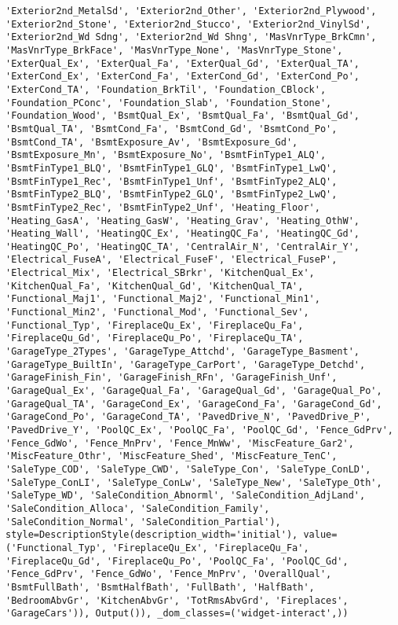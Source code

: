 \documentclass[11pt]{article}
\begin{document}
\begin{verbatim}
'Exterior2nd_MetalSd', 'Exterior2nd_Other', 'Exterior2nd_Plywood', 'Exterior2nd_Stone', 'Exterior2nd_Stucco', 'Exterior2nd_VinylSd', 'Exterior2nd_Wd Sdng', 'Exterior2nd_Wd Shng', 'MasVnrType_BrkCmn', 'MasVnrType_BrkFace', 'MasVnrType_None', 'MasVnrType_Stone', 'ExterQual_Ex', 'ExterQual_Fa', 'ExterQual_Gd', 'ExterQual_TA', 'ExterCond_Ex', 'ExterCond_Fa', 'ExterCond_Gd', 'ExterCond_Po', 'ExterCond_TA', 'Foundation_BrkTil', 'Foundation_CBlock', 'Foundation_PConc', 'Foundation_Slab', 'Foundation_Stone', 'Foundation_Wood', 'BsmtQual_Ex', 'BsmtQual_Fa', 'BsmtQual_Gd', 'BsmtQual_TA', 'BsmtCond_Fa', 'BsmtCond_Gd', 'BsmtCond_Po', 'BsmtCond_TA', 'BsmtExposure_Av', 'BsmtExposure_Gd', 'BsmtExposure_Mn', 'BsmtExposure_No', 'BsmtFinType1_ALQ', 'BsmtFinType1_BLQ', 'BsmtFinType1_GLQ', 'BsmtFinType1_LwQ', 'BsmtFinType1_Rec', 'BsmtFinType1_Unf', 'BsmtFinType2_ALQ', 'BsmtFinType2_BLQ', 'BsmtFinType2_GLQ', 'BsmtFinType2_LwQ', 'BsmtFinType2_Rec', 'BsmtFinType2_Unf', 'Heating_Floor', 'Heating_GasA', 'Heating_GasW', 'Heating_Grav', 'Heating_OthW', 'Heating_Wall', 'HeatingQC_Ex', 'HeatingQC_Fa', 'HeatingQC_Gd', 'HeatingQC_Po', 'HeatingQC_TA', 'CentralAir_N', 'CentralAir_Y', 'Electrical_FuseA', 'Electrical_FuseF', 'Electrical_FuseP', 'Electrical_Mix', 'Electrical_SBrkr', 'KitchenQual_Ex', 'KitchenQual_Fa', 'KitchenQual_Gd', 'KitchenQual_TA', 'Functional_Maj1', 'Functional_Maj2', 'Functional_Min1', 'Functional_Min2', 'Functional_Mod', 'Functional_Sev', 'Functional_Typ', 'FireplaceQu_Ex', 'FireplaceQu_Fa', 'FireplaceQu_Gd', 'FireplaceQu_Po', 'FireplaceQu_TA', 'GarageType_2Types', 'GarageType_Attchd', 'GarageType_Basment', 'GarageType_BuiltIn', 'GarageType_CarPort', 'GarageType_Detchd', 'GarageFinish_Fin', 'GarageFinish_RFn', 'GarageFinish_Unf', 'GarageQual_Ex', 'GarageQual_Fa', 'GarageQual_Gd', 'GarageQual_Po', 'GarageQual_TA', 'GarageCond_Ex', 'GarageCond_Fa', 'GarageCond_Gd', 'GarageCond_Po', 'GarageCond_TA', 'PavedDrive_N', 'PavedDrive_P', 'PavedDrive_Y', 'PoolQC_Ex', 'PoolQC_Fa', 'PoolQC_Gd', 'Fence_GdPrv', 'Fence_GdWo', 'Fence_MnPrv', 'Fence_MnWw', 'MiscFeature_Gar2', 'MiscFeature_Othr', 'MiscFeature_Shed', 'MiscFeature_TenC', 'SaleType_COD', 'SaleType_CWD', 'SaleType_Con', 'SaleType_ConLD', 'SaleType_ConLI', 'SaleType_ConLw', 'SaleType_New', 'SaleType_Oth', 'SaleType_WD', 'SaleCondition_Abnorml', 'SaleCondition_AdjLand', 'SaleCondition_Alloca', 'SaleCondition_Family', 'SaleCondition_Normal', 'SaleCondition_Partial'), style=DescriptionStyle(description_width='initial'), value=('Functional_Typ', 'FireplaceQu_Ex', 'FireplaceQu_Fa', 'FireplaceQu_Gd', 'FireplaceQu_Po', 'PoolQC_Fa', 'PoolQC_Gd', 'Fence_GdPrv', 'Fence_GdWo', 'Fence_MnPrv', 'OverallQual', 'BsmtFullBath', 'BsmtHalfBath', 'FullBath', 'HalfBath', 'BedroomAbvGr', 'KitchenAbvGr', 'TotRmsAbvGrd', 'Fireplaces', 'GarageCars')), Output()), _dom_classes=('widget-interact',))
    \end{verbatim}
\end{document}
